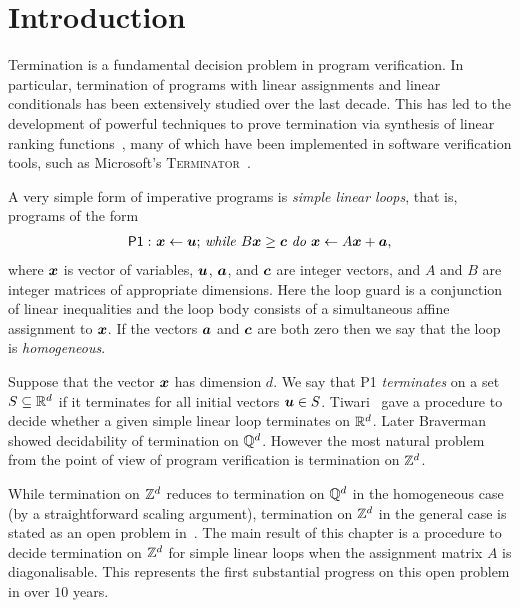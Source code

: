 \section{Introduction}
\label{sec:soda_intro}

Termination is a fundamental decision problem in program verification.
In particular, termination of programs with linear assignments and
linear conditionals has been extensively studied over the last decade.
This has led to the development of powerful techniques to
prove termination via synthesis of linear ranking
functions~\cite{Ben-AmramG13,BradleyMS05,ChenFM12,ColonS01,PodelskiR04},
many of which have been implemented in software verification tools, such as
Microsoft's \textsc{Terminator}~\cite{CookPR06}.

A very simple form of imperative programs is \emph{simple linear
  loops}, that is, programs of the form
\begin{gather*}
\mathsf{P1:}\  \mbox{$\boldsymbol{x}\gets \boldsymbol{u}$;
\textit{while} $B\boldsymbol{x} \geq \boldsymbol{c}$ \textit{do}
$\boldsymbol{x}\leftarrow A\boldsymbol{x}+\boldsymbol{a}$,}
\end{gather*}
where $\boldsymbol{x}$ is vector of variables, $\boldsymbol{u}$,
$\boldsymbol{a}$, and $\boldsymbol{c}$ are integer vectors, and $A$
and $B$ are integer matrices of appropriate dimensions.  Here the
loop guard is a conjunction of linear inequalities and the loop body
consists of a simultaneous affine assignment to $\boldsymbol{x}$.  If
the vectors $\boldsymbol{a}$ and $\boldsymbol{c}$ are both zero then
we say that the loop is \emph{homogeneous}.

Suppose that the vector $\boldsymbol{x}$ has dimension $d$.  We say
that \textsf{P1} \emph{terminates} on a set $S\subseteq \mathbb{R}^{d}$
if it terminates for all initial vectors $\boldsymbol{u} \in S$.
Tiwari~\cite{Tiw04} gave a procedure to decide whether a given simple
linear loop terminates on $\mathbb{R}^{d}$.  Later
Braverman~\cite{Bra06} showed decidability of termination on
$\mathbb{Q}^{d}$.  However the most natural problem from the point of
view of program verification is termination on $\mathbb{Z}^{d}$.

While termination on $\mathbb{Z}^{d}$ reduces to termination on
$\mathbb{Q}^{d}$ in the homogeneous case (by a straightforward scaling
argument), termination on $\mathbb{Z}^{d}$ in the general case is stated
as an open problem in~\cite{BGM12,Bra06,Tiw04}.  The main result of
this chapter is a procedure to decide termination on $\mathbb{Z}^{d}$ for
simple linear loops when the assignment matrix $A$ is diagonalisable.
This represents the first substantial progress on this open problem in
over $10$ years.

